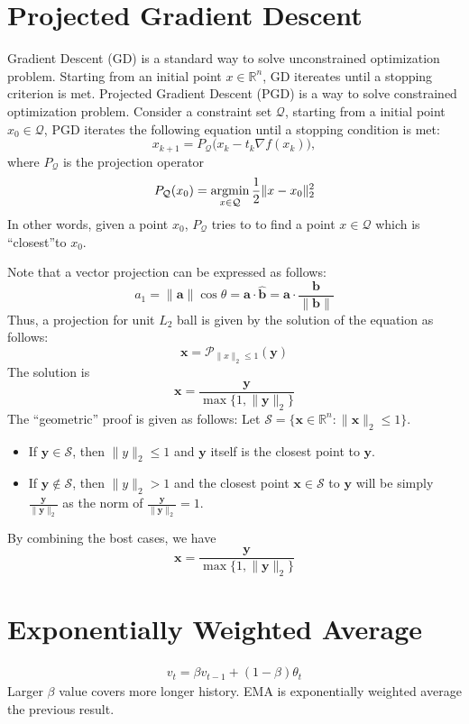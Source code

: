\section{Projected Gradient Descent}
Gradient Descent (GD) is a standard way to solve unconstrained optimization problem. Starting from an initial point $x\in \mathbb{R}^n$, GD itereates until a stopping criterion is met. Projected Gradient Descent (PGD) is a way to solve constrained optimization problem. Consider a constraint set $\mathcal{Q}$, starting from a initial point $x_0 \in \mathcal{Q}$, PGD iterates the following equation until a stopping condition is met:
$$x_{k+1} = P_\mathcal{Q} \Big(x_k - t_k \nabla f(x_k)\Big),$$
where $P_\mathcal{Q}$ is the projection operator
$$P_\mathcal{Q}(x_0) = \operatorname*{\operatorname{argmin}}_{x\in \mathcal{Q}} \frac{1}{2}\|x-x_0\|^2_2$$
In other words, given a point $x_0$, $P_\mathcal{Q}$ tries to to find a point $x\in \mathcal{Q}$ which is ``closest''to $x_0$.


Note that a vector projection can be expressed as follows:
$$a_1 = \|\mathbf{a}\|\cos \theta = \mathbf{a}\cdot \hat{\mathbf{b}} = \mathbf{a}\cdot \frac{\mathbf{b}}{\|\mathbf{b}\|}$$
Thus, a projection for unit $L_2$ ball is given by the solution of the equation as follows:
$$\mathbf{x} = \mathcal{P}_{\|x\|_2\leq 1}(\mathbf{y})$$
The solution is
$$\mathbf{x} = \frac{\mathbf{y}}{\max \{1,\|\mathbf{y}\|_2\}}$$
The ``geometric'' proof is given as follows: Let $\mathcal{S} = \{\mathbf{x}\in \mathbb{R}^n: \|\mathbf{x}\|_2 \leq 1\}.$
\begin{itemize}
		\item If $\mathbf{y}\in \mathcal{S}$, then $\|y\|_2\leq 1$ and $\mathbf{y}$ itself is the closest point to $\mathbf{y}$.
		\item If $\mathbf{y}\notin \mathcal{S}$, then $\|y\|_2> 1$ and the closest point $\mathbf{x}\in \mathcal{S}$ to $\mathbf{y}$ will be simply $\frac{\mathbf{y}}{\|\mathbf{y}\|_2}$ as the norm of $\frac{\mathbf{y}}{\|\mathbf{y}\|_2}=1$.
\end{itemize}
By combining the bost cases, we have
$$\mathbf{x} = \frac{\mathbf{y}}{\max \{1,\|\mathbf{y}\|_2\}}$$


\section{Exponentially Weighted Average}
\begin{align*}
    v_t = \beta v_{t-1} + (1-\beta) \theta_t
\end{align*}
Larger $\beta$ value covers more longer history. EMA is exponentially weighted average the previous result. 

